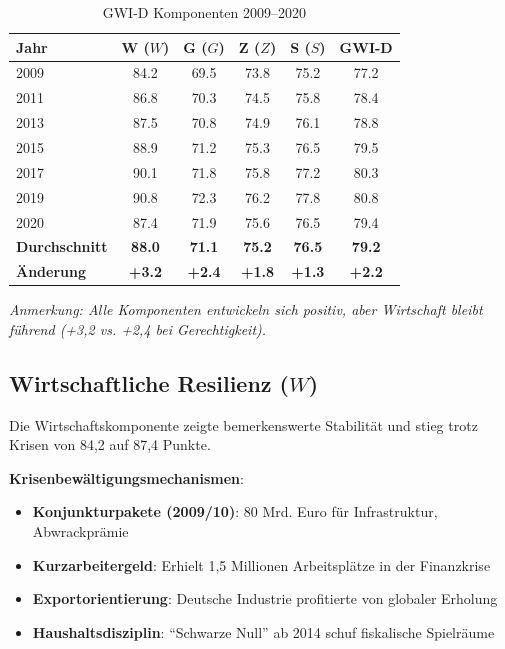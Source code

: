 \begin{table}[ht]
    \centering
    \caption{GWI-D Komponenten 2009–2020}
    \label{tab:gwi_krisen}
    \begin{tabular}{lccccc}
        \toprule
        \textbf{Jahr} & \textbf{W (\(W\))} & \textbf{G (\(G\))} & \textbf{Z (\(Z\))} & \textbf{S (\(S\))} & \textbf{GWI-D} \\
        \midrule
        2009 & 84.2 & 69.5 & 73.8 & 75.2 & 77.2 \\
        2011 & 86.8 & 70.3 & 74.5 & 75.8 & 78.4 \\
        2013 & 87.5 & 70.8 & 74.9 & 76.1 & 78.8 \\
        2015 & 88.9 & 71.2 & 75.3 & 76.5 & 79.5 \\
        2017 & 90.1 & 71.8 & 75.8 & 77.2 & 80.3 \\
        2019 & 90.8 & 72.3 & 76.2 & 77.8 & 80.8 \\
        2020 & 87.4 & 71.9 & 75.6 & 76.5 & 79.4 \\
        \midrule
        \textbf{Durchschnitt} & \textbf{88.0} & \textbf{71.1} & \textbf{75.2} & \textbf{76.5} & \textbf{79.2} \\
        \textbf{Änderung} & \textbf{+3.2} & \textbf{+2.4} & \textbf{+1.8} & \textbf{+1.3} & \textbf{+2.2} \\
        \bottomrule
    \end{tabular}
\end{table}

\begin{flushleft}
\footnotesize{\textit{Anmerkung: Alle Komponenten entwickeln sich positiv, aber Wirtschaft bleibt führend (+3,2 vs. +2,4 bei Gerechtigkeit).}}
\end{flushleft}

\subsection{Wirtschaftliche Resilienz (\(W\))}

Die Wirtschaftskomponente zeigte bemerkenswerte Stabilität und stieg trotz Krisen von 84,2 auf 87,4 Punkte.

\textbf{Krisenbewältigungsmechanismen}:
\begin{itemize}
    \item \textbf{Konjunkturpakete (2009/10)}: 80 Mrd. Euro für Infrastruktur, Abwrackprämie
    \item \textbf{Kurzarbeitergeld}: Erhielt 1,5 Millionen Arbeitsplätze in der Finanzkrise
    \item \textbf{Exportorientierung}: Deutsche Industrie profitierte von globaler Erholung
    \item \textbf{Haushaltsdisziplin}: \enquote{Schwarze Null} ab 2014 schuf fiskalische Spielräume
\end{itemize}

